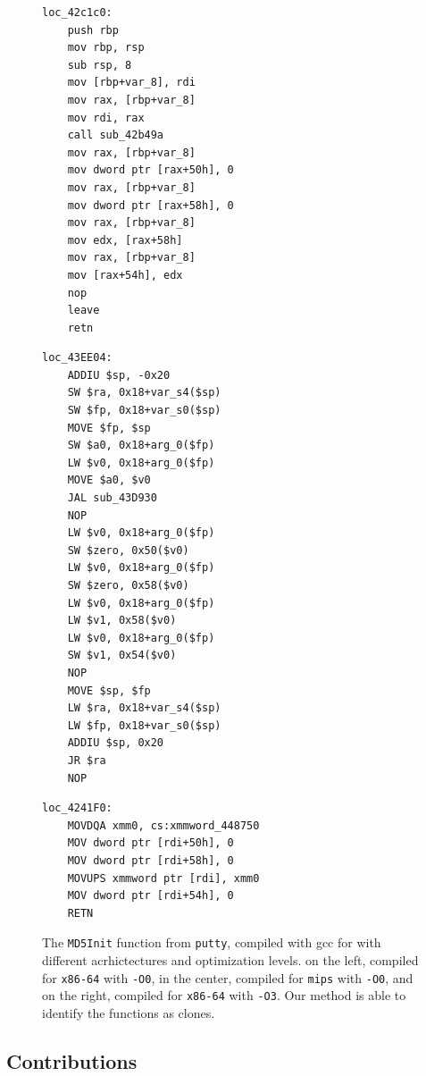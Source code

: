 \begin{figure}[!t]
\centering
\begin{minipage}[t]{0.32\linewidth}
\centering
\begin{verbatim}
loc_42c1c0:
    push rbp
    mov rbp, rsp
    sub rsp, 8
    mov [rbp+var_8], rdi
    mov rax, [rbp+var_8]
    mov rdi, rax
    call sub_42b49a
    mov rax, [rbp+var_8]
    mov dword ptr [rax+50h], 0
    mov rax, [rbp+var_8]
    mov dword ptr [rax+58h], 0
    mov rax, [rbp+var_8]
    mov edx, [rax+58h]
    mov rax, [rbp+var_8]
    mov [rax+54h], edx
    nop 
    leave 
    retn 
\end{verbatim}
\end{minipage}
\hfill
\begin{minipage}[t]{0.32\linewidth}
\centering
\begin{verbatim}
loc_43EE04:
    ADDIU $sp, -0x20
    SW $ra, 0x18+var_s4($sp)
    SW $fp, 0x18+var_s0($sp)
    MOVE $fp, $sp
    SW $a0, 0x18+arg_0($fp)
    LW $v0, 0x18+arg_0($fp)
    MOVE $a0, $v0
    JAL sub_43D930
    NOP 
    LW $v0, 0x18+arg_0($fp)
    SW $zero, 0x50($v0)
    LW $v0, 0x18+arg_0($fp)
    SW $zero, 0x58($v0)
    LW $v0, 0x18+arg_0($fp)
    LW $v1, 0x58($v0)
    LW $v0, 0x18+arg_0($fp)
    SW $v1, 0x54($v0)
    NOP 
    MOVE $sp, $fp
    LW $ra, 0x18+var_s4($sp)
    LW $fp, 0x18+var_s0($sp)
    ADDIU $sp, 0x20
    JR $ra
    NOP 
\end{verbatim}
\end{minipage}
\begin{minipage}[t]{0.32\linewidth}
\centering
\begin{verbatim}
loc_4241F0:
    MOVDQA xmm0, cs:xmmword_448750
    MOV dword ptr [rdi+50h], 0
    MOV dword ptr [rdi+58h], 0
    MOVUPS xmmword ptr [rdi], xmm0
    MOV dword ptr [rdi+54h], 0
    RETN
\end{verbatim}
\end{minipage}
\caption{The \texttt{MD5Init} function from \texttt{putty}, compiled with gcc for with different acrhictectures and optimization levels.
    on the left, compiled for \texttt{x86-64} with \texttt{-O0}, in the center, compiled for \texttt{mips} with \texttt{-O0}, and on the right,
    compiled for \texttt{x86-64} with \texttt{-O3}.  Our method is able to identify the functions as clones.}
\label{asm-diff}
\end{figure}

\subsection{Contributions}

